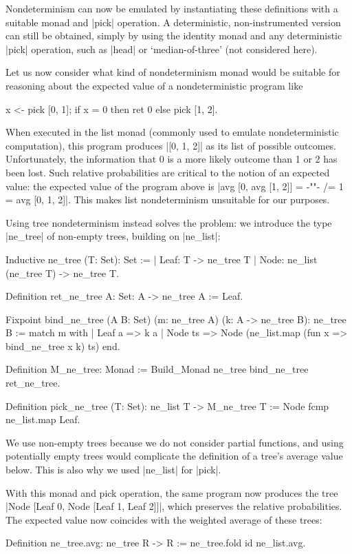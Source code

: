\documentclass[runningheads]{llncs}
\begin{document}
Nondeterminism can now be emulated by instantiating these definitions with a suitable monad and |pick| operation. A deterministic, non-instrumented version can still be obtained, simply by using the identity monad and any deterministic |pick| operation, such as |head| or `median-of-three' (not considered here).

Let us now consider what kind of nondeterminism monad would be suitable for reasoning about the expected value of a nondeterministic program like
\begin{code}
  x <- pick [0, 1]; if x = 0 then ret 0 else pick [1, 2].
\end{code}
When executed in the list monad (commonly used to emulate nondeterministic computation), this program
produces |[0, 1, 2]| as its list of possible outcomes. Unfortunately, the information that 0 is a more likely outcome than 1 or 2 has been lost. Such relative probabilities are critical to the notion of an expected value: the expected value of the program above is |avg [0, avg [1, 2]] = {-""-} /= 1 = avg [0, 1, 2]|. This makes list nondeterminism unsuitable for our purposes.

Using tree nondeterminism instead solves the problem: we introduce the type |ne_tree| of non-empty trees, building on |ne_list|: 
\begin{code}
  Inductive ne_tree (T: Set): Set :=
    | Leaf: T -> ne_tree T
    | Node: ne_list (ne_tree T) -> ne_tree T.

  Definition ret_ne_tree {A: Set}: A -> ne_tree A := Leaf.

  Fixpoint bind_ne_tree (A B: Set)
    (m: ne_tree A) (k: A -> ne_tree B): ne_tree B :=
      match m with
      | Leaf a => k a
      | Node ts => Node (ne_list.map (fun x => bind_ne_tree x k) ts)
      end.

  Definition M_ne_tree: Monad := Build_Monad ne_tree bind_ne_tree ret_ne_tree.

  Definition pick_ne_tree (T: Set): ne_list T -> M_ne_tree T
    := Node fcmp ne_list.map Leaf.
\end{code}
We use non-empty trees because we do not consider partial functions, and using potentially empty trees would complicate the definition of a tree's average value below. This is also why we used |ne_list| for |pick|.

With this monad and pick operation, the same program now produces the tree |Node [Leaf 0, Node [Leaf 1, Leaf 2]]|, which preserves the relative probabilities. The expected value now coincides with the weighted average of these trees:
\begin{code}
  Definition ne_tree.avg: ne_tree R -> R := ne_tree.fold id ne_list.avg.
\end{code}
\end{document}
